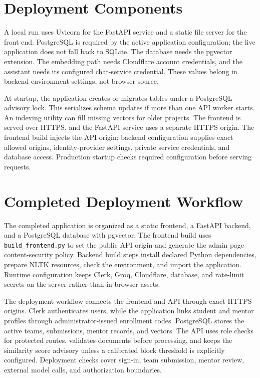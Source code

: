 \documentclass[12pt,a4paper]{report}
\begin{document}
\section{Deployment Components}
A local run uses Uvicorn for the FastAPI service and a static file server for the front end. PostgreSQL is required by the active application configuration; the live application does not fall back to SQLite. The database needs the pgvector extension. The embedding path needs Cloudflare account credentials, and the assistant needs its configured chat-service credential. These values belong in backend environment settings, not browser source.

At startup, the application creates or migrates tables under a PostgreSQL advisory lock. This serializes schema updates if more than one API worker starts. An indexing utility can fill missing vectors for older projects. The frontend is served over HTTPS, and the FastAPI service uses a separate HTTPS origin. The frontend build injects the API origin; backend configuration supplies exact allowed origins, identity-provider settings, private service credentials, and database access. Production startup checks required configuration before serving requests.


\section{Completed Deployment Workflow}
The completed application is organized as a static frontend, a FastAPI backend, and a PostgreSQL database with pgvector. The frontend build uses \texttt{build\_frontend.py} to set the public API origin and generate the admin page content-security policy. Backend build steps install declared Python dependencies, prepare NLTK resources, check the environment, and import the application. Runtime configuration keeps Clerk, Groq, Cloudflare, database, and rate-limit secrets on the server rather than in browser assets.

The deployment workflow connects the frontend and API through exact HTTPS origins. Clerk authenticates users, while the application links student and mentor profiles through administrator-issued enrollment codes. PostgreSQL stores the active teams, submissions, mentor records, and vectors. The API uses role checks for protected routes, validates documents before processing, and keeps the similarity score advisory unless a calibrated block threshold is explicitly configured. Deployment checks cover sign-in, team submission, mentor review, external model calls, and authorization boundaries.
\end{document}
